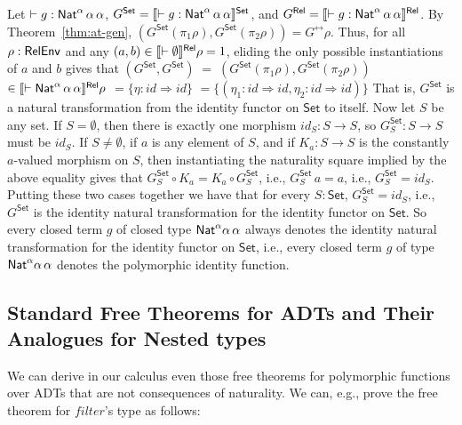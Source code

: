 \documentclass[runningheads]{llncs}
\newcommand{\set}{\mathsf{Set}}
\renewcommand{\id}{\mathit{id}}
\renewcommand{\id}{\mathit{id}}
\begin{document}
Let $ \vdash g : \mathsf{Nat}^\alpha \,\alpha\,\alpha$, \/$G^\set =
\setsem{\vdash g : \Nat^\alpha \,\alpha\,\alpha}$, and $G^{\mathsf{Rel}} =
\llbracket{\vdash g : \mathsf{Nat}^\alpha \,\alpha\,\alpha}\rrbracket^{\mathsf{Rel}}$.  By
Theorem~\ref{thm:at-gen}, $(G^\set(\pi_1\rho),G^\set(\pi_2\rho))
= G^\rel\rho$. Thus, for all $\rho :\mathsf{RelEnv}$ and any $(a, b) \in
\llbracket{\vdash \emptyset}\rrbracket^{\mathsf{Rel}}\rho = 1$, eliding the only possible
instantiations of $a$ and $b$ gives that
$(G^\set, G^\set) \; = \; (G^\set(\pi_1 \rho), G^\set (\pi_2 \rho))$
$ \in \llbracket{\vdash \mathsf{Nat}^\alpha \,\alpha\,\alpha}\rrbracket^{\mathsf{Rel}}\rho$
$ =  \{\eta : \id \Rightarrow \id\}$
$ =  \{(\eta_1 : \id \Rightarrow \id, \eta_2 : \id \Rightarrow
\id)\}$
That is, $G^\set$ is a natural transformation from the identity
functor on $\set$ to itself. Now let $S$ be any set.  If $S =
\emptyset$, then there is exactly one morphism $\id_S: S \to S$, so
$G^\set_S : S \to S$ must be $\id_S$. If $S \not = \emptyset$, if
$a$ is any element of $S$, and if $K_a :S \to S$ is the constantly
$a$-valued morphism on $S$, then instantiating the naturality square
implied by the above equality gives that $G^\set_S \circ K_a = K_a
\circ G^\set_S$, i.e., $G^\set_S \, a = a$, i.e., $G^\set_S = \id_S$.
Putting these two cases together we have that for every $S : \set$,
$G^\set_S = \id_S$, i.e., $G^\set$ is the identity natural
transformation for the identity functor on $\set$. So every closed
term $g$ of closed type $\mathsf{Nat}^\alpha\alpha\,\alpha$ always denotes the
identity natural transformation for the identity functor on $\set$,
i.e., every closed term $g$ of type $\mathsf{Nat}^\alpha\alpha\,\alpha$
denotes the polymorphic identity function.

\subsection{Standard Free Theorems for ADTs and Their Analogues for
  Nested types}\label{sec:ft-adt}

We can derive in our calculus even those free theorems for polymorphic
functions over ADTs that are not consequences of naturality.  We can,
e.g., prove the free theorem for $\mathit{filter}$'s type as follows:

\end{document}
